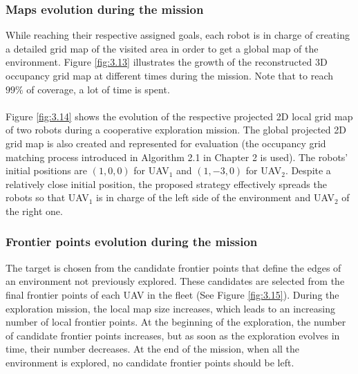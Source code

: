 \documentclass[11pt,openany]{book}
\begin{document}
\subsubsection{Maps evolution during the mission}
While reaching their respective assigned goals, each robot is in charge of creating a detailed grid map of the visited area in order to get a global map of the environment. Figure \ref{fig:3.13} illustrates the growth of the reconstructed 3D occupancy grid map at diﬀerent times during the mission. Note that to reach $99\%$ of coverage, a lot of time is spent.\\\\
Figure \ref{fig:3.14} shows the evolution of the respective projected 2D local grid map of two robots during a cooperative exploration mission. The global projected 2D grid map is also created and represented for evaluation (the occupancy grid matching process introduced in Algorithm 2.1 in Chapter 2 is used). The robots’ initial positions are $(1,0,0)$ for UAV$_1$ and $(1,-3,0)$ for UAV$_2$. Despite a relatively close initial position, the proposed strategy eﬀectively spreads the robots so that UAV$_1$ is in charge of the left side of the environment and UAV$_2$ of the right one.
\subsubsection{Frontier points evolution during the mission}
The target is chosen from the candidate frontier points that deﬁne the edges of an environment not previously explored. These candidates are selected from the ﬁnal frontier points of each UAV in the ﬂeet (See Figure \ref{fig:3.15}). During the exploration mission, the local map size increases, which leads to an increasing number of local frontier points. At the beginning of the exploration, the number of candidate frontier points increases, but as soon as the exploration evolves in time, their number decreases. At the end of the mission, when all the environment is explored, no candidate frontier points should be left.
\end{document}
